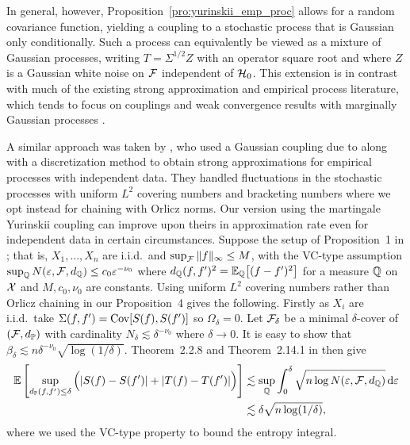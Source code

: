 In general, however, Proposition~\ref{pro:yurinskii_emp_proc} allows for a
random
covariance function, yielding a coupling to a stochastic process that is
Gaussian only conditionally. Such a process can equivalently be viewed as a
mixture of Gaussian processes, writing $T=\Sigma^{1/2} Z$ with an operator
square root and where $Z$ is a Gaussian white noise on $\mathcal{F}$ independent of
$\mathcal{H}_0$. This extension is in contrast with much of the existing strong
approximation and empirical process literature, which tends to focus on
couplings and weak convergence results with marginally Gaussian processes
\citep{settati2009gaussian,chernozhukov2016empirical}.

A similar approach was taken by \citet{berthet2006revisiting}, who used a
Gaussian coupling due to \citet{zaitsev1987estimates,zaitsev1987gaussian} along
with a discretization method to obtain strong approximations for empirical
processes with independent data. They handled fluctuations in the stochastic
processes with uniform $L^2$ covering numbers and bracketing numbers where we
opt instead for chaining with Orlicz norms. Our version using the martingale
Yurinskii coupling can improve upon theirs in approximation rate even for
independent data in certain circumstances. Suppose the setup of
Proposition~1 in \citet{berthet2006revisiting}; that is, $X_1, \ldots, X_n$ are
i.i.d.\ and $\sup_{\mathcal{F}} \|f\|_\infty \leq M$, with the VC-type assumption
$\sup_{\mathbb{Q}} N(\varepsilon, \mathcal{F}, d_{\mathbb{Q}}) \leq c_0 \varepsilon^{-\nu_0}$ where
$d_{\mathbb{Q}}(f,f')^2 = \mathbb{E}_{\mathbb{Q}}\big[(f-f')^2\big]$ for a measure $\mathbb{Q}$ on $\mathcal{X}$ and
$M, c_0, \nu_0$ are constants. Using uniform $L^2$ covering numbers
rather than Orlicz chaining in our Proposition~4 gives the following.
Firstly as $X_i$ are i.i.d.\ take $\Sigma(f, f') = \operatorname{Cov}[S(f), S(f')]$ so
$\Omega_\delta = 0$. Let $\mathcal{F}_\delta$ be a minimal $\delta$-cover of
$(\mathcal{F}, d_{\mathbb{P}})$ with cardinality $N_\delta \lesssim \delta^{-\nu_0}$ where
$\delta \to 0$. It is easy to show that
$\beta_\delta \lesssim n \delta^{-\nu_0} \sqrt{\log(1/\delta)}$.
Theorem~2.2.8 and Theorem~2.14.1 in \citet{van1996weak} then give
%
\begin{align*}
  \mathbb{E}\left[
    \sup_{d_{\mathbb{P}}(f,f') \leq \delta}
    \Big(
      |S(f) - S(f')|
      + |T(f) - T(f')|
    \Big)
  \right]
  &\lesssim
  \sup_{\mathbb{Q}}
  \int_0^\delta
  \sqrt{n \log N(\varepsilon, \mathcal{F}, d_{\mathbb{Q}})}
  \,\mathrm{d}\varepsilon \\
  &\lesssim
  \delta \sqrt{n\log(1/\delta)},
\end{align*}
%
where we used the VC-type property to bound the entropy integral.
